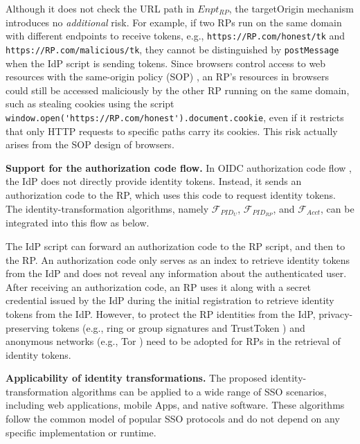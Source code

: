 Although it does not check the URL path in $Enpt_{RP}$,
the targetOrigin mechanism introduces no {\em additional} risk.
For example, if two RPs run on the same domain with different endpoints to receive tokens,
 e.g., \verb+https://RP.com/honest/tk+ and \verb+https://RP.com/malicious/tk+,
  they cannot be distinguished by \verb+postMessage+ when the IdP script is sending tokens.
Since browsers control access to web resources with the same-origin policy (SOP) \cite{sop},
   an RP's resources in browsers could still be accessed maliciously by the other RP running on the same domain,
    such as stealing cookies using the script \verb+window.open('https://RP.com/honest').document.cookie+,
even if it restricts that only HTTP requests to specific paths carry its cookies.
 This risk actually arises from the SOP design of browsers. %

\vspace{0.75mm}
\noindent \textbf{Support for the authorization code flow.} In OIDC authorization code flow \cite{OpenIDConnect},
 the IdP does not directly provide identity tokens.
 Instead, it sends an authorization code to the RP, which uses this code to request identity tokens.
 The identity-transformation algorithms, namely $\mathcal{F}_{PID_{U}}$, $\mathcal{F}_{PID_{RP}}$, and $\mathcal{F}_{Acct}$,
  can be integrated into this flow as below. %

The IdP script can forward an authorization code to the RP script,
 and then to the RP. %
 An authorization code only serves as an index to retrieve identity tokens from the IdP
  and does not reveal any information about the authenticated user.
After receiving an authorization code,
 an RP uses it along with a secret credential issued by the IdP during the initial registration \cite{OpenIDConnect}
  to retrieve identity tokens from the IdP.
  However, to protect the RP identities from the IdP, privacy-preserving tokens
   (e.g., ring or group signatures \cite{ring-sig,chaum1991group} and TrustToken \cite{trusttoken})
   and anonymous networks (e.g., Tor \cite{tor}) need to be adopted for RPs in the retrieval of identity tokens.



\vspace{0.75mm}
\noindent \textbf{Applicability of identity transformations.}
The proposed identity-transformation algorithms %
can be applied to a wide range of SSO scenarios, including web applications, mobile Apps, and native software.
These algorithms follow the common model of popular SSO protocols and do not depend on any specific implementation or runtime.%



